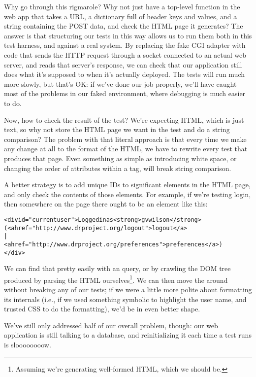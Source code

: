 \documentclass{report}
\begin{document}
Why go through this rigmarole? Why not just have a top-level function
in the web app that takes a URL, a dictionary full of header keys and
values, and a string containing the POST data, and check the HTML page
it generates? The answer is that structuring our tests in this way
allows us to run them both in this test harness, and against a real
system. By replacing the fake CGI adapter with code that sends the
HTTP request through a socket connected to an actual web server, and
reads that server's response, we can check that our application still
does what it's supposed to when it's actually deployed. The tests will
run much more slowly, but that's OK: if we've done our job properly,
we'll have caught most of the problems in our faked environment, where
debugging is much easier to do.

Now, how to check the result of the test? We're expecting HTML, which
is just text, so why not store the HTML page we want in the test and
do a string comparison? The problem with that literal approach is that
every time we make any change at all to the format of the HTML, we
have to rewrite every test that produces that page.  Even something as
simple as introducing white space, or changing the order of attributes
within a tag, will break string comparison.

A better strategy is to add unique IDs to significant elements in the
HTML page, and only check the contents of those elements. For example,
if we're testing login, then somewhere on the page there ought to be
an element like this:

\begin{alltt}
<div id="currentuser">Logged in as <strong>gvwilson</strong>
(<a href="http://www.drproject.org/logout">logout</a>
|
<a href="http://www.drproject.org/preferences">preferences</a>)
</div>
\end{alltt}

We can find that pretty easily with an  query, or by
crawling the DOM tree produced by parsing the HTML
ourselves\footnote{Assuming we're generating well-formed HTML, which
we should be.}.  We can then move the  around without
breaking any of our tests; if we were a little more polite about
formatting its internals (i.e., if we used something symbolic to
highlight the user name, and trusted CSS to do the formatting), we'd
be in even better shape.

We've still only addressed half of our overall problem, though: our
web application is still talking to a database, and reinitializing it
each time a test runs is sloooooooow.
\end{document}
